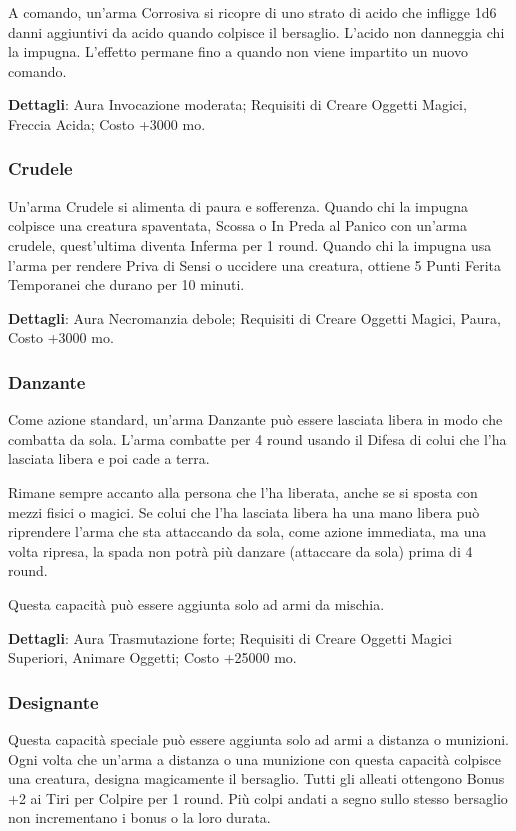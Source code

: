 \begin{multicols}{2}
A comando, un'arma Corrosiva si ricopre di uno strato di acido che infligge 1d6 danni aggiuntivi da acido quando colpisce il bersaglio. L'acido non danneggia chi la impugna. L'effetto permane fino a quando non viene impartito un nuovo comando.

\textbf{Dettagli}: Aura Invocazione moderata; Requisiti di Creare Oggetti Magici, Freccia Acida; Costo +3000 mo.


\subsubsection{Crudele}

Un'arma Crudele si alimenta di paura e sofferenza. Quando chi la impugna colpisce una creatura spaventata, Scossa o In Preda al Panico con un'arma crudele, quest'ultima diventa Inferma per 1 round. Quando chi la impugna usa l'arma per rendere Priva di Sensi o uccidere una creatura, ottiene 5 Punti Ferita Temporanei che durano per 10 minuti.

\textbf{Dettagli}: Aura Necromanzia debole; Requisiti di Creare Oggetti Magici, Paura, Costo +3000 mo.

\subsubsection{Danzante}

Come azione standard, un'arma Danzante può essere lasciata libera in modo che combatta da sola. L'arma combatte per 4 round usando il Difesa di colui che l'ha lasciata libera e poi cade a terra. 

Rimane sempre accanto alla persona che l'ha liberata, anche se si sposta con mezzi fisici o magici. Se colui che l'ha lasciata libera ha una mano libera può riprendere l'arma che sta attaccando da sola, come azione immediata, ma una volta ripresa, la spada non potrà più danzare (attaccare da sola) prima di 4 round.

Questa capacità può essere aggiunta solo ad armi da mischia.

\textbf{Dettagli}: Aura Trasmutazione forte; Requisiti di Creare Oggetti Magici Superiori, Animare Oggetti; Costo +25000 mo.

\subsubsection{Designante}

Questa capacità speciale può essere aggiunta solo ad armi a distanza o munizioni. Ogni volta che un'arma a distanza o una munizione con questa capacità colpisce una creatura, designa magicamente il bersaglio. Tutti gli alleati ottengono Bonus +2 ai Tiri per Colpire per 1 round. Più colpi andati a segno sullo stesso bersaglio non incrementano i bonus o la loro durata.


\end{multicols}
